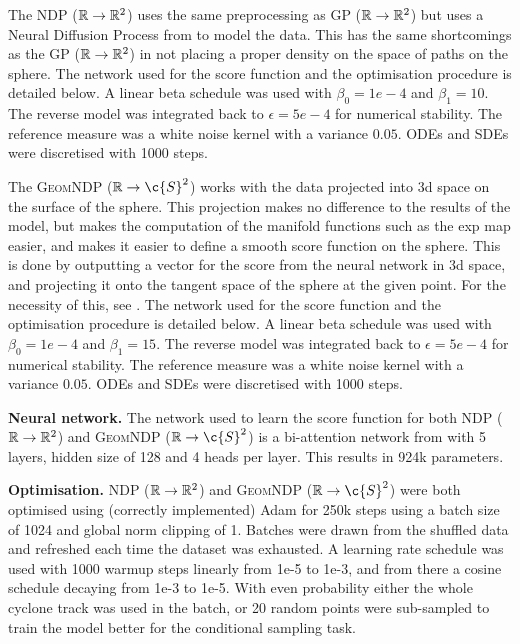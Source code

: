 The \textsc{NDP ($\mathbb{R}\to\mathbb{R}^2$)} uses the same preprocessing as \textsc{GP ($\mathbb{R}\to\mathbb{R}^2$)} but uses a Neural Diffusion Process from \cite{dutordoir2022Neural} to model the data.
This has the same shortcomings as the \textsc{GP ($\mathbb{R}\to\mathbb{R}^2$)} in not placing a proper density on the space of paths on the sphere.
The network used for the score function and the optimisation procedure is detailed below.
A linear beta schedule was used with $\beta_0=1e-4$ and $\beta_1=10$.
The reverse model was integrated back to $\epsilon=5e-4$ for numerical stability.
The reference measure was a white noise kernel with a variance $0.05$.
ODEs and SDEs were discretised with 1000 steps.

The \textsc{GeomNDP ($\R\to\c{S}^2$)} works with the data projected into 3d space on the surface of the sphere.
This projection makes no difference to the results of the model, but makes the computation of the manifold functions such as the exp map easier, and makes it easier to define a smooth score function on the sphere.
This is done by outputting a vector for the score from the neural network in 3d space, and projecting it onto the tangent space of the sphere at the given point.
For the necessity of this, see \cite{debortoli2021neurips}.
The network used for the score function and the optimisation procedure is detailed below.
A linear beta schedule was used with $\beta_0=1e-4$ and $\beta_1=15$.
The reverse model was integrated back to $\epsilon=5e-4$ for numerical stability.
The reference measure was a white noise kernel with a variance $0.05$.
ODEs and SDEs were discretised with 1000 steps.

\textbf{Neural network.}
The network used to learn the score function for both \textsc{NDP ($\mathbb{R}\to\mathbb{R}^2$)} and \textsc{GeomNDP ($\R\to\c{S}^2$)} is a bi-attention network from \textcite{dutordoir2022Neural} with 5 layers, hidden size of 128 and 4 heads per layer.
This results in 924k parameters.

\textbf{Optimisation. } \textsc{NDP ($\mathbb{R}\to\mathbb{R}^2$)} and \textsc{GeomNDP  ($\R\to\c{S}^2$)} were both optimised using (correctly implemented) Adam for 250k steps using a batch size of 1024 and global norm clipping of 1.
Batches were drawn from the shuffled data and refreshed each time the dataset was exhausted.
A learning rate schedule was used with 1000 warmup steps linearly from 1e-5 to 1e-3, and from there a cosine schedule decaying from 1e-3 to 1e-5.
With even probability either the whole cyclone track was used in the batch, or 20 random points were sub-sampled to train the model better for the conditional sampling task.

